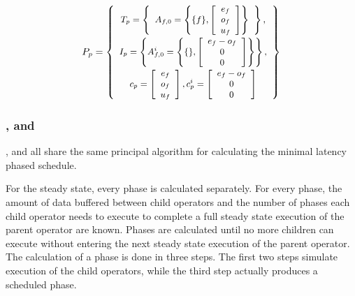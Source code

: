 \begin{displaymath} \small
P_p = \left\{
\begin{array}{c}
T_p = \left\{
\begin{array}{c}
A_{f,0} = \left\{ \{f\}, \left[\begin{array}{c} e_f \\ o_f \\ u_f \end{array}\right]\right\} \\
\end{array}\right\}, \\
I_p = \left\{ A^i_{f,0} = \left\{ \{ \}, \left[\begin{array}{c}e_f - o_f \\ 0 \\ 0 \end{array}\right]\right\} \right\}, \\
c_p = \left[ \begin{array}{c} e_f \\ o_f \\ u_f \end{array}
\right], c^i_p = \left[ \begin{array}{c} e_f - o_f \\ 0 \\ 0
\end{array} \right]
\end{array}
\right\}
\end{displaymath}

\subsubsection{{\pipeline}, {\splitjoin} and {\feedbackloop}}

{\pipeline}, {\splitjoin} and {\feedbackloop} all share the same
principal algorithm for calculating the minimal latency phased
schedule.

For the steady state, every phase is calculated separately. For
every phase, the amount of data buffered between child operators
and the number of phases each child operator needs to execute to
complete a full steady state execution of the parent operator are
known. Phases are calculated until no more children can execute
without entering the next steady state execution of the parent
operator. The calculation of a phase is done in three steps. The
first two steps simulate execution of the child operators, while
the third step actually produces a scheduled phase.

